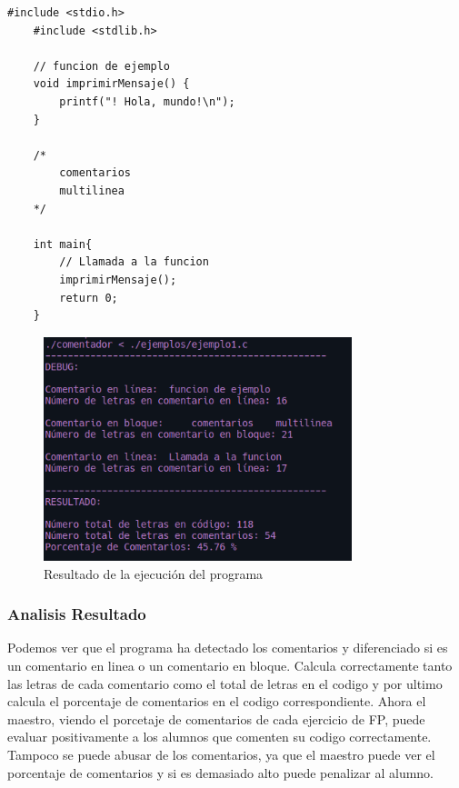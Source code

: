 \documentclass{article}
\begin{document}
            \vspace{\baselineskip} %
    
        \lstset{language=C, breaklines=true, basicstyle=\footnotesize}
        \begin{lstlisting}[frame=single, caption={Ejemplo de Entrada}]        
    #include <stdio.h>
    #include <stdlib.h>
                
    // funcion de ejemplo
    void imprimirMensaje() {
        printf("! Hola, mundo!\n");
    }

    /*
        comentarios
        multilinea
    */

    int main{
        // Llamada a la funcion
        imprimirMensaje();
        return 0;
    }
        \end{lstlisting}
       
        \newpage

        \begin{figure}[!h]
            \centering
            \includegraphics[width=0.8\textwidth]{./Imagenes/salida1.png}
            \caption{Resultado de la ejecución del programa}
        \end{figure}

        \subsubsection*{Analisis Resultado}
     Podemos ver que el programa ha detectado los comentarios y diferenciado si es un comentario en linea o 
     un comentario en bloque. Calcula correctamente tanto las letras de cada comentario como el total de letras en el codigo y por
     ultimo calcula el porcentaje de comentarios en el codigo  correspondiente.
     Ahora el maestro, viendo el porcetaje de comentarios de cada ejercicio de FP, puede evaluar positivamente a los alumnos que comenten su codigo correctamente.
     Tampoco se puede abusar de los comentarios, ya que el maestro puede ver el porcentaje de comentarios y si es demasiado alto puede penalizar al alumno.
\end{document}
